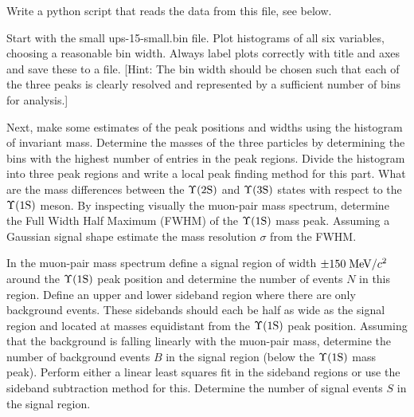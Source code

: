 Write a python script that reads the data from this file, see below. 


\vspace*{-0.5cm}

Start with the small ups-15-small.bin file. Plot histograms of all six variables, choosing a reasonable bin width. Always label plots correctly with title and axes and save these to a file. [Hint: The bin width should be chosen such that each of the three peaks is clearly resolved and represented by a sufficient number of bins for analysis.]

Next, make some estimates of the peak positions and widths using the histogram of invariant mass.  Determine the masses of the three particles by determining the bins with the highest number of entries in the peak regions. Divide the histogram into three peak regions and write a local peak finding method for this part.
What are the mass differences between the $\Upsilon \rm (2S)$ and $\Upsilon \rm (3S)$ states with respect to the $\Upsilon \rm (1S)$ meson. By inspecting visually the muon-pair mass spectrum, determine the Full Width Half Maximum (FWHM) of the $\Upsilon \rm (1S)$ mass peak. Assuming a Gaussian signal shape estimate the mass resolution $\sigma$ from the FWHM. %

In the muon-pair mass spectrum define a signal region of width $\pm 150\; {\rm MeV}/c^2$ around the $\Upsilon \rm (1S)$  peak position and determine the number of events $N$ in this region.
Define an upper and lower sideband region where there are only background events. These sidebands should each be half as wide as the signal region and located at masses equidistant from the $\Upsilon \rm (1S)$  peak position. Assuming that the background is falling linearly with the muon-pair mass, determine the number of background events $B$ in the signal region (below the $\Upsilon \rm (1S)$  mass peak). Perform either a linear least squares fit in the sideband regions or use the sideband subtraction method for this. Determine the number of signal events $S$ in the signal region.

